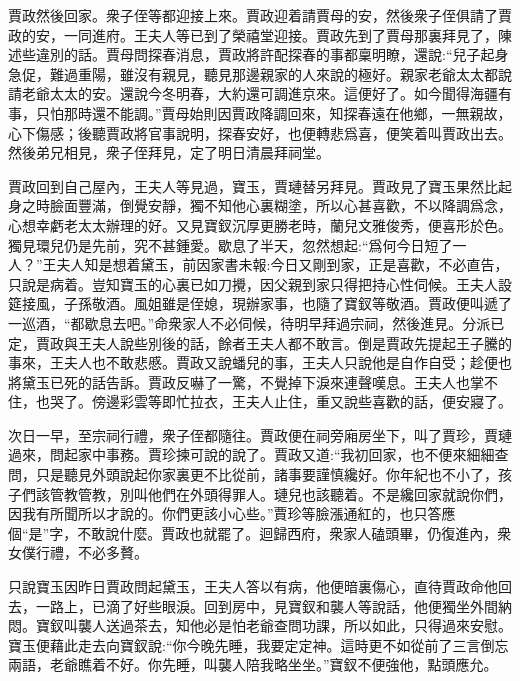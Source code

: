 \begin{parag}
    賈政然後回家。衆子侄等都迎接上來。賈政迎着請賈母的安，然後衆子侄俱請了賈政的安，一同進府。王夫人等已到了榮禧堂迎接。賈政先到了賈母那裏拜見了，陳述些違別的話。賈母問探春消息，賈政將許配探春的事都稟明瞭，還說:“兒子起身急促，難過重陽，雖沒有親見，聽見那邊親家的人來說的極好。親家老爺太太都說請老爺太太的安。還說今冬明春，大約還可調進京來。這便好了。如今聞得海疆有事，只怕那時還不能調。”賈母始則因賈政降調回來，知探春遠在他鄉，一無親故，心下傷感；後聽賈政將官事說明，探春安好，也便轉悲爲喜，便笑着叫賈政出去。然後弟兄相見，衆子侄拜見，定了明日清晨拜祠堂。
\end{parag}


\begin{parag}
    賈政回到自己屋內，王夫人等見過，寶玉，賈璉替另拜見。賈政見了寶玉果然比起身之時臉面豐滿，倒覺安靜，獨不知他心裏糊塗，所以心甚喜歡，不以降調爲念，心想幸虧老太太辦理的好。又見寶釵沉厚更勝老時，蘭兒文雅俊秀，便喜形於色。獨見環兒仍是先前，究不甚鍾愛。歇息了半天，忽然想起:“爲何今日短了一人？”王夫人知是想着黛玉，前因家書未報:今日又剛到家，正是喜歡，不必直告，只說是病着。豈知寶玉的心裏已如刀攪，因父親到家只得把持心性伺候。王夫人設筵接風，子孫敬酒。風姐雖是侄媳，現辦家事，也隨了寶釵等敬酒。賈政便叫遞了一巡酒，“都歇息去吧。”命衆家人不必伺候，待明早拜過宗祠，然後進見。分派已定，賈政與王夫人說些別後的話，餘者王夫人都不敢言。倒是賈政先提起王子騰的事來，王夫人也不敢悲慼。賈政又說蟠兒的事，王夫人只說他是自作自受；趁便也將黛玉已死的話告訴。賈政反嚇了一驚，不覺掉下淚來連聲嘆息。王夫人也掌不住，也哭了。傍邊彩雲等即忙拉衣，王夫人止住，重又說些喜歡的話，便安寢了。
\end{parag}


\begin{parag}
    次日一早，至宗祠行禮，衆子侄都隨往。賈政便在祠旁廂房坐下，叫了賈珍，賈璉過來，問起家中事務。賈珍揀可說的說了。賈政又道:“我初回家，也不便來細細查問，只是聽見外頭說起你家裏更不比從前，諸事要謹慎纔好。你年紀也不小了，孩子們該管教管教，別叫他們在外頭得罪人。璉兒也該聽着。不是纔回家就說你們，因我有所聞所以才說的。你們更該小心些。”賈珍等臉漲通紅的，也只答應個“是”字，不敢說什麼。賈政也就罷了。迴歸西府，衆家人磕頭畢，仍復進內，衆女僕行禮，不必多贅。
\end{parag}


\begin{parag}
    只說寶玉因昨日賈政問起黛玉，王夫人答以有病，他便暗裏傷心，直待賈政命他回去，一路上，已滴了好些眼淚。回到房中，見寶釵和襲人等說話，他便獨坐外間納悶。寶釵叫襲人送過茶去，知他必是怕老爺查問功課，所以如此，只得過來安慰。寶玉便藉此走去向寶釵說:“你今晚先睡，我要定定神。這時更不如從前了三言倒忘兩語，老爺瞧着不好。你先睡，叫襲人陪我略坐坐。”寶釵不便強他，點頭應允。
\end{parag}


